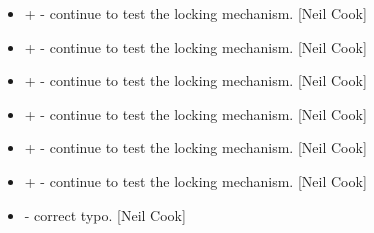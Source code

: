 \documentclass[a4paper,10pt,english]{report}
\begin{document}
\begin{itemize}
\item {} 
 +  - continue to test the locking mechanism. {[}Neil
Cook{]}

\item {} 
 +  - continue to test the locking mechanism. {[}Neil
Cook{]}

\item {} 
 +  - continue to test the locking mechanism. {[}Neil
Cook{]}

\item {} 
 +  - continue to test the locking mechanism. {[}Neil
Cook{]}

\item {} 
 +  - continue to test the locking mechanism. {[}Neil
Cook{]}

\item {} 
 +  - continue to test the locking mechanism. {[}Neil
Cook{]}

\item {} 
 - correct typo. {[}Neil Cook{]}

\end{itemize}
\end{document}
